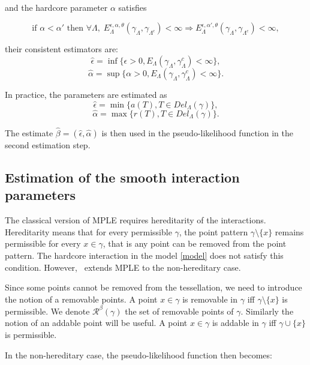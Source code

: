 \documentclass[12pt,a4paper]{report}
\begin{document}
and the hardcore parameter $\alpha$ satisfies

$$ \text{if } \alpha < \alpha' \text{ then  } \forall \Lambda, \; E^{\epsilon,\alpha,\theta}_\Lambda(\gamma_\Lambda,\gamma_{\Lambda^c}) < \infty \Rightarrow  E^{\epsilon,\alpha',\theta}_\Lambda(\gamma_\Lambda,\gamma_{\Lambda^c})<\infty,$$ 

their consistent estimators are:
$$\hat\epsilon = \inf\{\epsilon > 0, E_\Lambda(\gamma_\Lambda, \gamma_\Lambda^c) < \infty \},$$
$$\hat\alpha = \sup\{\alpha > 0, E_\Lambda(\gamma_\Lambda, \gamma_\Lambda^c) < \infty \}.$$

In practice, the parameters are estimated as
$$\hat\epsilon = \min\{a(T), T\in Del_\Lambda(\gamma)\},$$
$$\hat\alpha = \max\{r(T), T\in Del_\Lambda(\gamma)\}.$$

The estimate $\hat\beta = (\hat\epsilon,\hat\alpha)$ is then used in the pseudo-likelihood function in the second estimation step.


\subsection{Estimation of the smooth interaction parameters}


The classical version of MPLE requires hereditarity of the interactions. Hereditarity means that for every permissible $\gamma$, the point pattern $\gamma\setminus\{x\}$ remains permissible for every $x\in\gamma$, that is any point can be removed from the point pattern. The hardcore interaction in the model \ref{model} does not satisfy this condition. However,~\cite{DL07} extends MPLE to the non-hereditary case. 

Since some points cannot be removed from the tessellation, we need to introduce the notion of a removable points. A point $x\in\gamma$ is removable in $\gamma$ iff $\gamma\setminus\{x\}$ is permissible. We denote $\mathcal R^\beta(\gamma)$ the set of removable points of $\gamma$. Similarly the notion of an addable point will be useful. A point $x\in\gamma$ is addable in $\gamma$ iff $\gamma \cup \{x\}$ is permissible.


In the non-hereditary case, the pseudo-likelihood function then becomes:
\end{document}

